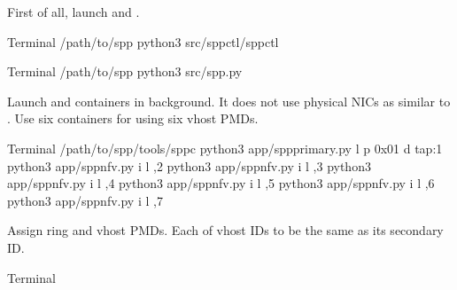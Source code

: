 \documentclass[a4paper,11pt,openany,oneside,english]{sphinxmanual}
\begin{document}
First of all, launch  and .

\begin{sphinxVerbatim}[commandchars=\\\{\},formatcom=\footnotesize]
 Terminal 
  /path/to/spp
 python3 src/spp\PYGZhy{}ctl/spp\PYGZhy{}ctl

 Terminal 
  /path/to/spp
 python3 src/spp.py
\end{sphinxVerbatim}

Launch  and  containers in background.
It does not use physical NICs as similar to
{\hyperref[\detokenize{tools/sppc/usecases:sppc-usecases-test-vhost-single}]{}}.
Use six  containers for using six vhost PMDs.

\begin{sphinxVerbatim}[commandchars=\\\{\},formatcom=\footnotesize]
 Terminal 
  /path/to/spp/tools/sppc
 python3 app/spp\PYGZhy{}primary.py \PYGZhy{}l  \PYGZhy{}p 0x01 \PYGZhy{}d tap:1
 python3 app/spp\PYGZhy{}nfv.py \PYGZhy{}i  \PYGZhy{}l ,2
 python3 app/spp\PYGZhy{}nfv.py \PYGZhy{}i  \PYGZhy{}l ,3
 python3 app/spp\PYGZhy{}nfv.py \PYGZhy{}i  \PYGZhy{}l ,4
 python3 app/spp\PYGZhy{}nfv.py \PYGZhy{}i  \PYGZhy{}l ,5
 python3 app/spp\PYGZhy{}nfv.py \PYGZhy{}i  \PYGZhy{}l ,6
 python3 app/spp\PYGZhy{}nfv.py \PYGZhy{}i  \PYGZhy{}l ,7
\end{sphinxVerbatim}

Assign ring and vhost PMDs. Each of vhost IDs to be the same as
its secondary ID.

\begin{sphinxVerbatim}[commandchars=\\\{\},formatcom=\footnotesize]
 Terminal 
\end{sphinxVerbatim}
\end{document}

